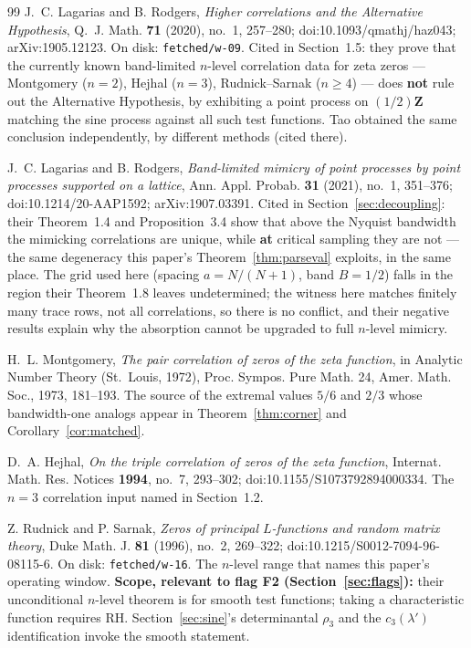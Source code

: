 \documentclass[11pt]{article}
\theoremstyle{plain}
\theoremstyle{definition}
\theoremstyle{remark}
\newcommand{\Z}{\mathbf{Z}}
\begin{document}
\begin{thebibliography}{99}
 J.~C. Lagarias and B. Rodgers, \emph{Higher correlations
and the Alternative Hypothesis}, Q.~J. Math. \textbf{71} (2020), no.~1,
257--280; doi:10.1093/qmathj/haz043; arXiv:1905.12123. On disk:
\texttt{fetched/w-09}. Cited in
Section~1.5: they prove that the currently known band-limited $n$-level
correlation data for zeta zeros --- Montgomery ($n = 2$), Hejhal ($n = 3$),
Rudnick--Sarnak ($n \ge 4$) --- does \textbf{not} rule out the Alternative
Hypothesis, by exhibiting a point process on $(1/2)\Z$ matching the sine process
against all such test functions. Tao obtained the same conclusion independently,
by different methods (cited there).

 J.~C. Lagarias and B. Rodgers, \emph{Band-limited mimicry
of point processes by point processes supported on a lattice}, Ann. Appl.
Probab. \textbf{31} (2021), no.~1, 351--376; doi:10.1214/20-AAP1592;
arXiv:1907.03391. Cited in
Section~\ref{sec:decoupling}: their Theorem~1.4 and Proposition~3.4 show that
above the Nyquist bandwidth the mimicking correlations are unique, while
\textbf{at} critical sampling they are not --- the same degeneracy this paper's
Theorem~\ref{thm:parseval} exploits, in the same place. The grid used here
(spacing $a = N/(N+1)$, band $B = 1/2$) falls in the region their Theorem~1.8
leaves undetermined; the witness here matches finitely many trace rows, not all
correlations, so there is no conflict, and their negative results explain why the
absorption cannot be upgraded to full $n$-level mimicry.

 H.~L. Montgomery, \emph{The pair correlation of zeros of
the zeta function}, in Analytic Number Theory (St.~Louis, 1972), Proc. Sympos.
Pure Math. 24, Amer. Math. Soc., 1973, 181--193. The source of the extremal
values $5/6$ and $2/3$ whose bandwidth-one analogs appear in
Theorem~\ref{thm:corner} and Corollary~\ref{cor:matched}.

 D.~A. Hejhal, \emph{On the triple correlation of zeros of
the zeta function}, Internat. Math. Res. Notices \textbf{1994}, no.~7,
293--302; doi:10.1155/S1073792894000334. The $n = 3$ correlation input named in
Section~1.2.

 Z. Rudnick and P. Sarnak, \emph{Zeros of principal
$L$-functions and random matrix theory}, Duke Math. J. \textbf{81} (1996),
no.~2, 269--322; doi:10.1215/S0012-7094-96-08115-6. On disk:
\texttt{fetched/w-16}. The $n$-level range that names this
paper's operating window. \textbf{Scope, relevant to flag F2
(Section~\ref{sec:flags}):} their unconditional $n$-level theorem is for smooth
test functions; taking a characteristic function requires RH.
Section~\ref{sec:sine}'s determinantal $\rho_3$ and the $c_3(\lambda')$
identification invoke the smooth statement.


\end{thebibliography}
\end{document}

